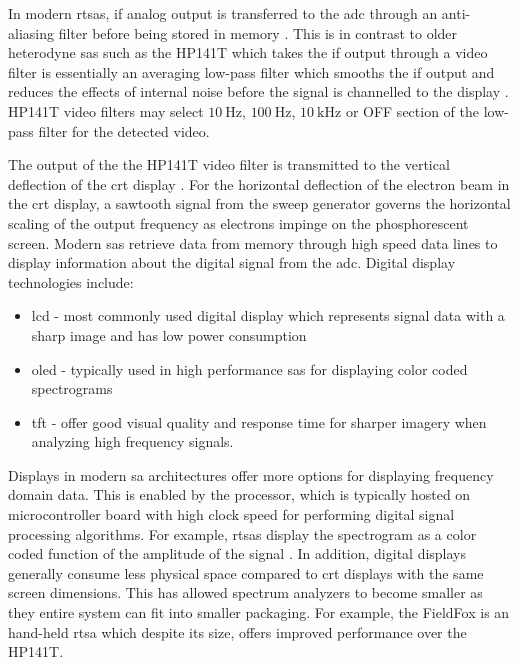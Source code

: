\documentclass[class=report,11pt,crop=false]{standalone}
\begin{document}
	In modern \acrshort{rtsa}s, \acrshort{if} analog output is transferred to the \acrshort{adc} through an anti-aliasing filter before being stored in memory \cite{tektronixRSA2208A}. This is in contrast to older heterodyne \acrshort{sa}s such as the HP141T which takes the \acrshort{if} output through a video filter is essentially an averaging low-pass filter which smooths the \acrshort{if} output and reduces the effects of internal noise before the signal is channelled to the display \cite{rauscher2007}. HP141T video filters may select $\SI{10}{\hertz}$, $\SI{100}{\hertz}$, $\SI{10}{\kilo\hertz}$ or OFF section of the low-pass filter for the detected video. 
	
	The output of the the HP141T video filter is transmitted to the vertical deflection of the \acrshort{crt} display \cite{HPsiganalyzers}. For the horizontal deflection of the electron beam in the \acrshort{crt} display, a sawtooth signal from the sweep generator governs the horizontal scaling of the output frequency as electrons impinge on the phosphorescent screen. Modern \acrshort{sa}s retrieve data from memory through high speed data lines to display information about the digital signal from the \acrshort{adc}. Digital display technologies include:
	
	\begin{itemize}
		\item 
		\acrshort{lcd} - most commonly used digital display which represents signal data with a sharp image and has low power consumption
		\item 
		\acrshort{oled} - typically used in high performance \acrshort{sa}s for displaying color coded spectrograms
		\item 
		\acrshort{tft} - offer good visual quality and response time for sharper imagery when analyzing high frequency signals.
	\end{itemize}

	Displays in modern \acrshort{sa} architectures offer more options for displaying frequency domain data. This is enabled by the processor, which is typically hosted on microcontroller board with high clock speed for performing digital signal processing algorithms. For example, \acrshort{rtsa}s display the spectrogram as a color coded function of the amplitude of the signal \cite{al2013}. In addition, digital displays generally consume less physical space compared to \acrshort{crt} displays with the same screen dimensions. This has allowed spectrum analyzers to become smaller as they entire system can fit into smaller packaging. For example, the FieldFox is an hand-held \acrshort{rtsa} which despite its size, offers improved performance over the HP141T.
	
\end{document}
